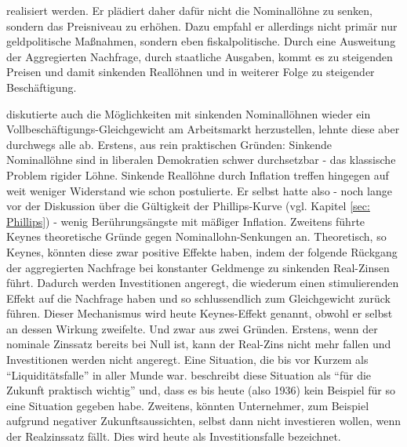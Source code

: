 realisiert werden. Er plädiert daher dafür nicht die Nominallöhne zu senken, sondern das Preisniveau zu erhöhen. Dazu empfahl er allerdings nicht primär nur geldpolitische Maßnahmen, sondern eben fiskalpolitische. Durch eine Ausweitung der Aggregierten Nachfrage, durch staatliche Ausgaben, kommt es zu steigenden Preisen und damit sinkenden Reallöhnen und in weiterer Folge zu steigender Beschäftigung.

\textcite{Keynes1936} diskutierte auch die Möglichkeiten mit sinkenden Nominallöhnen wieder ein Vollbeschäftigungs-Gleichgewicht am Arbeitsmarkt herzustellen, lehnte diese aber durchwegs alle ab. Erstens, aus rein praktischen Gründen: Sinkende Nominallöhne sind in liberalen Demokratien schwer durchsetzbar - das klassische Problem rigider Löhne. Sinkende Reallöhne durch Inflation treffen hingegen auf weit weniger Widerstand wie schon \textcite[S. 14]{Keynes1936} postulierte. Er selbst hatte also - noch lange vor der Diskussion über die Gültigkeit der Phillips-Kurve (vgl. Kapitel \ref{sec: Phillips}) - wenig Berührungsängste mit mäßiger Inflation. Zweitens führte Keynes theoretische Gründe gegen Nominallohn-Senkungen an. Theoretisch, so Keynes, könnten diese zwar positive Effekte haben, indem der folgende Rückgang der aggregierten Nachfrage bei konstanter Geldmenge zu sinkenden Real-Zinsen führt. Dadurch werden Investitionen angeregt, die wiederum einen stimulierenden Effekt auf die Nachfrage haben und so schlussendlich zum Gleichgewicht zurück führen. Dieser Mechanismus wird heute Keynes-Effekt genannt, obwohl er selbst an dessen Wirkung zweifelte. Und zwar aus zwei Gründen. Erstens, wenn der nominale Zinssatz bereits bei Null ist, kann der Real-Zins nicht mehr fallen und Investitionen werden nicht angeregt. Eine Situation, die bis vor Kurzem als "`Liquiditätsfalle"' in aller Munde war. \textcite[S. 207]{Keynes1936} beschreibt diese Situation als "`für die Zukunft praktisch wichtig"' und, dass es bis heute (also 1936) kein Beispiel für so eine Situation gegeben habe. Zweitens, könnten Unternehmer, zum Beispiel aufgrund negativer Zukunftsaussichten, selbst dann nicht investieren wollen, wenn der Realzinssatz fällt. Dies wird heute als Investitionsfalle bezeichnet.

